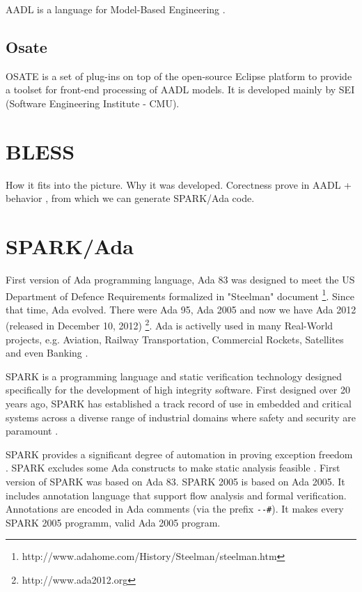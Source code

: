 AADL is a language for Model-Based Engineering \cite{AadlBook}.

\subsection{Osate}
\label{background:aadl:osate}
OSATE is a set of plug-ins on top of the open-source Eclipse platform to provide a toolset for front-end processing of AADL models. It is developed mainly by SEI (Software Engineering Institute - CMU). %



\section{BLESS}
\label{background:bless}
How it fits into the picture. Why it was developed. Corectness prove in AADL + behavior \cite{Bless:Paper}, from which we can generate SPARK/Ada code.



\section{SPARK/Ada}
\label{background:spark}

First version of Ada programming language, Ada 83 was designed to meet the US Department of Defence Requirements formalized in "Steelman" document \footnote{http://www.adahome.com/History/Steelman/steelman.htm}. Since that time, Ada evolved. There were Ada 95, Ada 2005 and now we have Ada 2012 (released in December 10, 2012) \footnote{http://www.ada2012.org}. Ada is activelly used in many Real-World projects, e.g. Aviation, Railway Transportation, Commercial Rockets, Satellites and even Banking \cite{AdaUsaege:Online}.

SPARK is a programming language and static verification technology designed specifically for the development of high integrity software. First designed over 20 years ago, SPARK has established a track record of use in embedded and critical systems across a diverse range of industrial domains where safety and security are paramount \cite{Barnes:Book}. 

SPARK provides a significant degree of automation in proving exception freedom \cite{Spark:Article}. SPARK excludes some Ada constructs to make static analysis feasible \cite{Spark:Article}. First version of SPARK was based on Ada 83. SPARK 2005 is based on Ada 2005. It includes annotation language that support flow analysis and formal verification. Annotations are encoded in Ada comments (via the prefix \lstinline[basicstyle=\ttfamily]{--#}). It makes every SPARK 2005 programm, valid Ada 2005 program.

